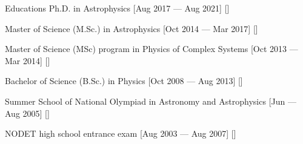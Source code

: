 \begin{cvsection}{Educations}
    \cvitem
    {Ph.D. in Astrophysics}
    [Aug 2017 --- Aug 2021]
    [\ipa]

    \cvitem
    {Master of Science (M.Sc.) in Astrophysics}
    [Oct 2014 --- Mar 2017]
    [\AIfA]
    
    \cvitem
    {Master of Science (MSc) program in Physics of Complex Systems}
    [Oct 2013 --- Mar 2014]
    [\SBU]
    
    \cvitem
    {Bachelor of Science (B.Sc.) in Physics}
    [Oct 2008 --- Aug 2013]
    [\SBU]
    
    
    \cvitem
    {Summer School of National Olympiad in Astronomy and Astrophysics}
    [Jun --- Aug 2005]
    [\YSC]
    
    \cvitem
    {NODET high school entrance exam}
    [Aug 2003 --- Aug 2007]
    [\NODET]
\end{cvsection}